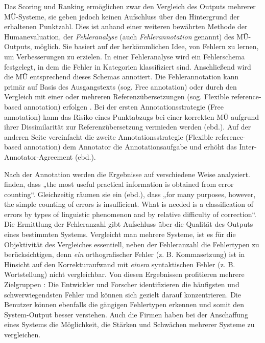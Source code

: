 Das Scoring und Ranking ermöglichen zwar den Vergleich des Outputs mehrerer MÜ-Systeme, sie geben jedoch keinen Aufschluss über den Hintergrund der erhaltenen Punktzahl. Dies ist anhand einer weiteren bewährten Methode der Humanevaluation, der \textit{Fehleranalyse} (auch\textbf{ }\textit{Fehlerannotation}\textbf{ }genannt) des MÜ-Outputs, möglich. Sie basiert auf der herkömmlichen Idee, von Fehlern zu lernen, um Verbesserungen zu erzielen. In einer Fehleranalyse wird ein Fehlerschema festgelegt, in dem die Fehler in Kategorien klassifiziert sind. Anschließend wird die MÜ entsprechend dieses Schemas annotiert. Die Fehlerannotation kann primär auf Basis des Ausgangstexts (sog. Free annotation) oder durch den Vergleich mit einer oder mehreren Referenzübersetzungen (sog. Flexible reference-based annotation) erfolgen \citep{FishelEtAl2012}. Bei der ersten Annotationsstrategie (Free annotation) kann das Risiko eines Punktabzugs bei einer korrekten MÜ aufgrund ihrer Dissimilarität zur Referenzübersetzung vermieden werden (ebd.). Auf der anderen Seite vereinfacht die zweite Annotationsstrategie (Flexible reference-based annotation) dem Annotator die Annotationsaufgabe und erhöht das Inter-Annotator-Agreement (ebd.).

Nach der Annotation werden die Ergebnisse auf verschiedene Weise analysiert. \citet[164]{HutchinsSomers1992} finden, dass „the most useful practical information is obtained from error counting“. Gleichzeitig räumen sie ein (ebd.), dass „for many purposes, however, the simple counting of errors is insufficient. What is needed is a classification of errors by types of linguistic phenomenon and by relative difficulty of correction“. Die Ermittlung der Fehleranzahl gibt Aufschluss über die Qualität des Outputs eines bestimmten Systems. Vergleicht man mehrere Systeme, ist es für die Objektivität des Vergleiches essentiell, neben der Fehleranzahl die Fehlertypen zu berücksichtigen, denn \textit{ein} orthografischer Fehler (z. B. Kommasetzung) ist in Hinsicht auf den Korrekturaufwand mit \textit{einem} syntaktischen Fehler (z. B. Wortstellung) nicht vergleichbar. Von diesen Ergebnissen profitieren mehrere Zielgruppen \citep{Stymne2013}: Die Entwickler und Forscher identifizieren die häufigsten und schwerwiegendsten Fehler und können sich gezielt darauf konzentrieren. Die Benutzer können ebenfalls die gängigen Fehlertypen erkennen und somit den System-Output besser verstehen. Auch die Firmen haben bei der Anschaffung eines Systems die Möglichkeit, die Stärken und Schwächen mehrerer Systeme zu vergleichen.


